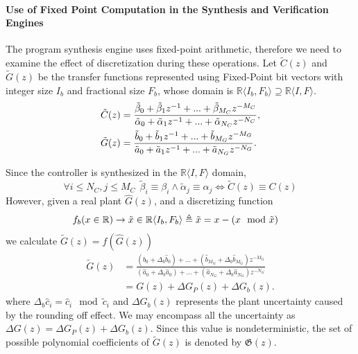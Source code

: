\documentclass{sig-alternate-05-2015}
\newcommand{\red}[1]{{\color{red}#1}}
\begin{document}

\paragraph{Use of Fixed Point Computation in the Synthesis and Verification Engines}
The program synthesis engine uses fixed-point arithmetic,
therefore we need to examine the effect of discretization during these operations.
Let $\tilde C(z)$ and $\tilde G(z)$ be the transfer functions represented
using Fixed-Point bit vectors with integer size $I_b$ and fractional
size $F_b$, whose domain is $\mathbb{R}\langle I_b,F_b \rangle \supseteq \mathbb{R}\langle I,F \rangle$.
%
\begin{align}
\small
\label{digital_controller_plant_tf}
\tilde C(z)&=\frac{\tilde \beta_{0}+\tilde \beta_{1}z^{-1}+...+\tilde \beta_{M_C}z^{-M_C}}{\tilde \alpha_{0}+\tilde \alpha_{1}z^{-1}+...+\tilde \alpha_{N_C}z^{-N_C}}, \\
\tilde G(z)&=\frac{\tilde b_{0}+\tilde b_{1}z^{-1}+...+\tilde b_{M_G}z^{-M_G}}{\tilde a_{0}+\tilde a_{1}z^{-1}+...+\tilde a_{N_G}z^{-N_G}}.
\end{align}
 
Since the controller is synthesized in the $\mathbb{R}\langle I,F \rangle$
domain,
%
 $$\forall i \leq N_C, j \leq M_C\ \  \tilde \beta_{i} \equiv \beta_{i} \wedge \tilde \alpha_{j} \equiv \alpha_{j} \Leftrightarrow \tilde C(z) \equiv C(z)$$
%
However, given a real plant $\hat{G}(z)$, and a discretizing function
\begin{align}
\small
\label{FWL_tf}
&f_b (x \in \mathbb{R}) \rightarrow \tilde x \in \mathbb{R}\langle I_b,F_b \rangle \triangleq \tilde x = x-(x\mod\tilde x)
\end{align}
we calculate $\tilde G(z)=f(\hat{G}(z))$
\begin{align}
\label{digital_plant_tf}
\tilde G(z)&=\frac{(\hat{b}_{0}+\Delta_b \hat{b}_{0}) +...+(\hat{b}_{M_G}+\Delta_b \hat{b}_{M_G})z^{-M_G}}{(\hat{a}_{0}+\Delta_b \hat{a}_{0})+...+(\hat{a}_{N_G}+\Delta_b \hat{a}_{N_G})z^{-N_G}} \nonumber \\
&=G(z)+\Delta{G}_P(z)+\Delta{G}_b(z).
\end{align}
where $\Delta_b\hat{c}_i=\hat{c}_i\mod \tilde{c}_i$
and $\Delta{G}_b(z)$ represents the plant uncertainty caused by
the rounding off effect.  We may encompass all the uncertainty as
$\Delta{G}(z)=\Delta{G}_P(z)+\Delta{G}_b(z)$.  Since this value is
nondeterministic, the set of possible polynomial coefficients of $\tilde G(z)$ is
denoted by $\mathfrak{G}(z)$.
\end{document}
